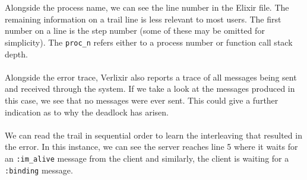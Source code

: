 \\ \\
Alongside the process name, we can see the line number in the Elixir file. The remaining information on a trail line is less relevant to most users. The first number on a line is the step number (some of these may be omitted for simplicity). The \texttt{proc\_n} refers either to a process number or function call stack depth.
\\ \\
Alongside the error trace, Verlixir also reports a trace of all messages being sent and received through the system. If we take a look at the messages produced in this case, we see that no messages were ever sent. This could give a further indication as to why the deadlock has arisen.
\\ \\
We can read the trail in sequential order to learn the interleaving that resulted in the error. In this instance, we can see the server reaches line 5 where it waits for an \texttt{:im\_alive} message from the client and similarly, the client is waiting for a \texttt{:binding} message.
